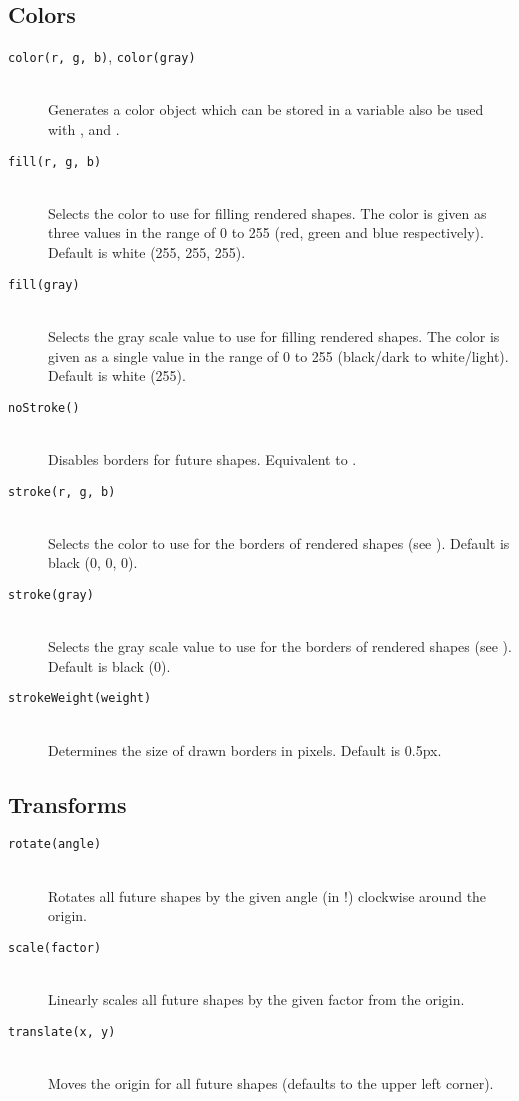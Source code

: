 \subsection{Colors}
\begin{description}
\item[\texttt{color(r, g, b)}, \texttt{color(gray)}] \hfill \\
	Generates a color object which can be stored in a variable also be used with ,  and .
\item[\texttt{fill(r, g, b)}] \hfill \\
	Selects the color to use for filling rendered shapes. The color is given as three values in the range of 0 to 255 (red, green and blue respectively). Default is white (255, 255, 255).
\item[\texttt{fill(gray)}] \hfill \\
	Selects the gray scale value to use for filling rendered shapes. The color is given as a single value in the range of 0 to 255 (black/dark to white/light). Default is white (255).
\item[\texttt{noStroke()}] \hfill \\
	Disables borders for future shapes. Equivalent to .
\item[\texttt{stroke(r, g, b)}] \hfill \\
	Selects the color to use for the borders of rendered shapes (see ). Default is black (0, 0, 0).
\item[\texttt{stroke(gray)}] \hfill \\
	Selects the gray scale value to use for the borders of rendered shapes (see ). Default is black (0).
\item[\texttt{strokeWeight(weight)}] \hfill \\
	Determines the size of drawn borders in pixels. Default is 0.5px.
\end{description}

\subsection{Transforms}
\begin{description}
\item[\texttt{rotate(angle)}] \hfill \\
	Rotates all future shapes by the given angle (in !) clockwise around the origin.
\item[\texttt{scale(factor)}] \hfill \\
	Linearly scales all future shapes by the given factor from the origin.
\item[\texttt{translate(x, y)}] \hfill \\
	Moves the origin  for all future shapes (defaults to the upper left corner).
\end{description}

